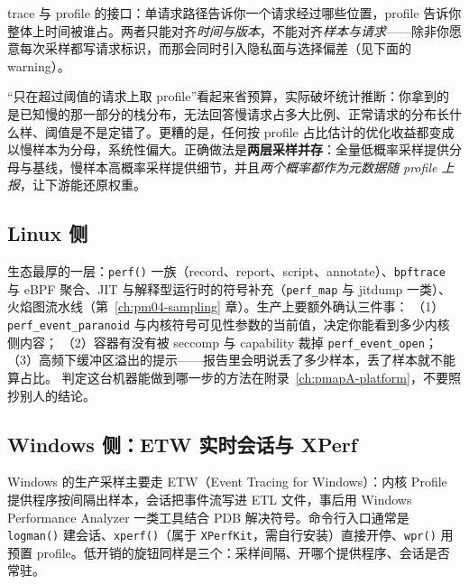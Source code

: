 \documentclass[12pt,a4paper,fontset=fandol]{ctexbook}
\newcommand{\Fn}[1]{\texttt{#1()}}
\newcommand{\Tp}[1]{\texttt{#1}}
\newcommand{\Bk}{\discretionary{}{}{}}
\begin{document}
trace 与 profile 的接口：单请求路径告诉你一个请求经过哪些位置，profile 告诉你整体上时间被谁占。两者只能对齐\emph{时间与版本}，不能对齐\emph{样本与请求}——除非你愿意每次采样都写请求标识，而那会同时引入隐私面与选择偏差（见下面的 warning）。

\begin{warning}[title={只在慢请求上采样会引入幸存者偏差}]
\label{box:pm14-survivor}
``只在超过阈值的请求上取 profile''看起来省预算，实际破坏统计推断：你拿到的是已知慢的那一部分的栈分布，无法回答慢请求占多大比例、正常请求的分布长什么样、阈值是不是定错了。更糟的是，任何按 profile 占比估计的优化收益都变成以慢样本为分母，系统性偏大。正确做法是\textbf{两层采样并存}：全量低概率采样提供分母与基线，慢样本高概率采样提供细节，并且\emph{两个概率都作为元数据随 profile 上报}，让下游能还原权重。
\end{warning}

\subsection{Linux 侧}
\label{sub:pm14-linux}

生态最厚的一层：\Fn{perf} 一族（record、report、script、annotate）、\Tp{bpftrace} 与 eBPF 聚合、JIT 与解释型运行时的符号补充（\Tp{perf{\Bk}\_map} 与 jitdump 一类）、火焰图流水线（第~\ref{ch:pm04-sampling} 章）。生产上要额外确认三件事：
（1）\Tp{perf{\Bk}\_event{\Bk}\_paranoid} 与内核符号可见性参数的当前值，决定你能看到多少内核侧内容；
（2）容器有没有被 seccomp 与 capability 裁掉 \Tp{perf{\Bk}\_event{\Bk}\_open}；
（3）高频下缓冲区溢出的提示——报告里会明说丢了多少样本，丢了样本就不能算占比。
判定这台机器能做到哪一步的方法在附录~\ref{ch:pmapA-platform}，不要照抄别人的结论。

\subsection{Windows 侧：ETW 实时会话与 XPerf}
\label{sub:pm14-windows}

Windows 的生产采样主要走 ETW（Event Tracing for Windows）：内核 Profile 提供程序按间隔出样本，会话把事件流写进 ETL 文件，事后用 Windows Performance Analyzer 一类工具结合 PDB 解决符号。命令行入口通常是 \Fn{logman} 建会话、\Fn{xperf}（属于 \Tp{XPerf{\Bk}Kit}，需自行安装）直接开停、\Fn{wpr} 用预置 profile。低开销的旋钮同样是三个：采样间隔、开哪个提供程序、会话是否常驻。
\end{document}

